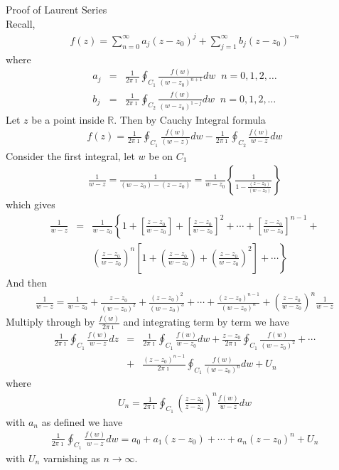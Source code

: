 \documentclass[11pt]{report}
\newcommand{\sps}{\\[0.2cm]}
\newcommand{\dsp}{\displaystyle}
\newcommand{\NI}{\noindent}
\newcommand{\real}{ \mathbb{R}}
\newcommand{\imaginary}{\imath}
\begin{document}
	\NI Proof of Laurent Series
	\\Recall,
	\begin{eqnarray*}
		f(z) = \sum_{n=0}^{\infty}a_j(z-z_0)^j + \sum_{j=1}^{\infty}b_j(z-z_0)^{-n}
	\end{eqnarray*}
	where
	\begin{eqnarray*}
		a_j &=& \frac{1}{2\pi\imaginary}\oint_{C_1}\frac{f(w)}{(w-z_0)^{n+1}}dw\;\; n=0,1,2,\ldots\sps
		b_j &=& \frac{1}{2\pi\imaginary}\oint_{C_2}\frac{f(w)}{(w-z_0)^{1-j}}dw\;\; n=0,1,2,\ldots
	\end{eqnarray*}
	Let $z$ be a point inside $\real$. Then by Cauchy Integral formula
	\begin{eqnarray*}
		f(z) = \frac{1}{2\pi\imaginary}\oint_{C_1}\frac{f(w)}{(w-z)}dw - \frac{1}{2\pi\imaginary}\oint_{C_2}\frac{f(w)}{w-z}dw
	\end{eqnarray*}
	Consider the first integral, let $w$ be on $C_1$
	\begin{eqnarray*}
		\frac{1}{w-z} = \frac{1}{(w-z_0)-(z-z_0)} = \frac{1}{w-z_0}\left\{\frac{1}{1-\frac{(z-z_0)}{(w-z_0)}}\right\}
	\end{eqnarray*}
	which gives
	\begin{eqnarray*}
		\frac{1}{w-z} &=& \frac{1}{w-z_0}\left\{1+ \left[\frac{z-z_0}{w-z_0}\right] + \left[\frac{z-z_0}{w-z_0}\right]^2 + \cdots + \left[\frac{z-z_0}{w-z_0}\right]^{n-1} +\right. \sps
		 && \left. \left(\frac{z-z_0}{w-z_0}\right)^n\left[ 1 + \left(\frac{z-z_0}{w-z_0}\right) + \left(\frac{z-z_0}{w-z_0}\right)^2 \right] + \cdots  \right\}
	\end{eqnarray*}
	And then
	\begin{eqnarray*}
		\frac{1}{w-z} = \frac{1}{w-z_0} + \frac{z-z_0}{(w-z_0)^2} + \frac{(z-z_0)^2}{(w-z_0)^3} + \cdots + \frac{(z-z_0)^{n-1}}{(w-z_0)^n} + \left(\frac{z-z_0}{w-z_0}\right)^n\frac{1}{w-z}
	\end{eqnarray*}
	Multiply through by $\dsp \frac{f(w)}{2\pi\imaginary}$ and integrating term by term we have
	\begin{eqnarray*}
		\frac{1}{2\pi \imaginary}\oint_{C_1}\frac{f(w)}{w-z}dz &=& \frac{1}{2\pi\imaginary}\oint_{C_1}\frac{f(w)}{w-z_0} dw + \frac{z-z_0}{2\pi\imaginary}\oint_{C_1}\frac{f(w)}{(w-z_0)^2}+ \cdots \sps
		&+&\frac{(z-z_0)^{n-1}}{2\pi\imaginary}\oint_{C_1}\frac{f(w)}{(w-z_0)^n}dw + U_n
	\end{eqnarray*}
	where 
	\begin{eqnarray*}
		U_n = \frac{1}{2\pi\imaginary}\oint_{C_1}\left(\frac{z-z_0}{z-z_0}\right)^n \frac{f(w)}{w-z}dw
	\end{eqnarray*}
	with $a_n$ as defined we have 
	\begin{eqnarray*}
		\frac{1}{2\pi\imaginary}\oint_{C_1}\frac{f(w)}{w-z}dw = a_0 + a_1(z-z_0) + \cdots + a_n(z-z_0)^n + U_n
	\end{eqnarray*}
	with $U_n$ varnishing as $n\rightarrow\infty$.\\
	
\end{document}
